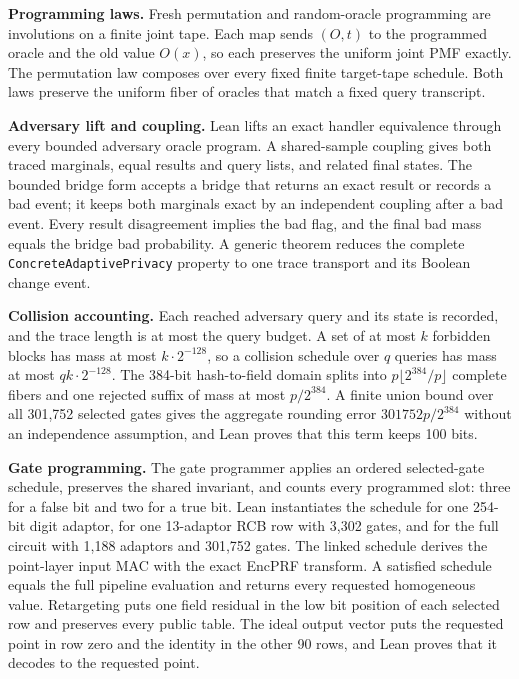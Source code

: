 \documentclass[10pt]{article}
\begin{document}
\textbf{Programming laws.}
Fresh permutation and random-oracle programming are involutions on a finite joint tape.
Each map sends $(O,t)$ to the programmed oracle and the old value $O(x)$, so each preserves the uniform joint PMF exactly.
The permutation law composes over every fixed finite target-tape schedule.
Both laws preserve the uniform fiber of oracles that match a fixed query transcript.

\textbf{Adversary lift and coupling.}
Lean lifts an exact handler equivalence through every bounded adversary oracle program.
A shared-sample coupling gives both traced marginals, equal results and query lists, and related final states.
The bounded bridge form accepts a bridge that returns an exact result or records a bad event; it keeps both marginals exact by an independent coupling after a bad event.
Every result disagreement implies the bad flag, and the final bad mass equals the bridge bad probability.
A generic theorem reduces the complete \texttt{ConcreteAdaptivePrivacy} property to one trace transport and its Boolean change event.

\textbf{Collision accounting.}
Each reached adversary query and its state is recorded, and the trace length is at most the query budget.
A set of at most $k$ forbidden blocks has mass at most $k\cdot2^{-128}$, so a collision schedule over $q$ queries has mass at most $qk\cdot2^{-128}$.
The 384-bit hash-to-field domain splits into $p\lfloor2^{384}/p\rfloor$ complete fibers and one rejected suffix of mass at most $p/2^{384}$.
A finite union bound over all 301,752 selected gates gives the aggregate rounding error $301752p/2^{384}$ without an independence assumption, and Lean proves that this term keeps 100 bits.

\textbf{Gate programming.}
The gate programmer applies an ordered selected-gate schedule, preserves the shared invariant, and counts every programmed slot: three for a false bit and two for a true bit.
Lean instantiates the schedule for one 254-bit digit adaptor, for one 13-adaptor RCB row with 3,302 gates, and for the full circuit with 1,188 adaptors and 301,752 gates.
The linked schedule derives the point-layer input MAC with the exact EncPRF transform.
A satisfied schedule equals the full pipeline evaluation and returns every requested homogeneous value.
Retargeting puts one field residual in the low bit position of each selected row and preserves every public table.
The ideal output vector puts the requested point in row zero and the identity in the other 90 rows, and Lean proves that it decodes to the requested point.
\end{document}
